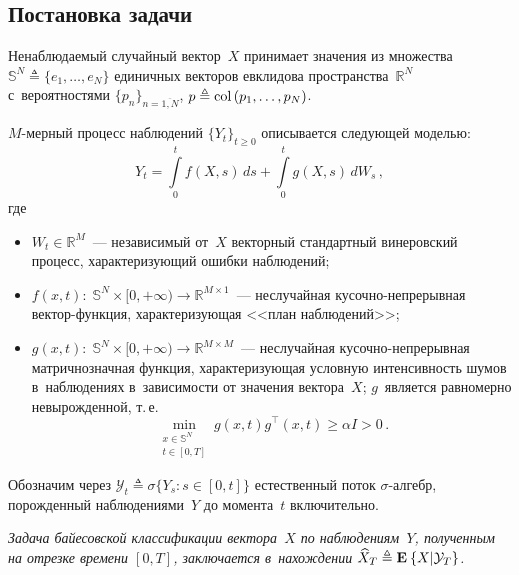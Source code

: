 \begin{multicols}{2}
\vspace*{-9pt}

  \section{Постановка задачи}
  
  \vspace*{-3pt}
  
  Ненаблюдаемый случайный вектор~$X$ принимает значения из множества 
  $\mathbb{S}^N \triangleq \{e_1,\ldots,e_N\}$ единичных векторов евклидова 
  пространства~$\mathbb{R}^N$ с~вероятностями $\{p_n\}_{n=\overline{1,N}}$,
   $p\triangleq \mathop{\mathrm{col}}\,(p_1,\ldots,p_N)$.

  $M$-мерный процесс наблюдений $\{Y_t\}_{t \geqslant 0}$ описывается 
  следующей моделью:
  \begin{equation*}
  Y_t = \int\limits_0^t f(X,s)\,ds + \int\limits_0^t g(X,s)\,dW_s\,,
  \end{equation*}
  где
  \begin{itemize}
  \item
  $W_t \in \mathbb{R}^M$~--- независимый от~$X$ 
  векторный стандартный винеровский процесс, характери\-зу\-ющий ошибки наблюдений;
  \item
  $f(x,t):\;\mathbb{S}^N \times [0,+\infty) \to \mathbb{R}^{M \times 1}$~--- 
  неслучайная ку\-соч\-но-не\-пре\-рыв\-ная век\-тор-функ\-ция, 
  характеризующая <<план наблюдений>>;
  \item
  $g(x,t):\;\mathbb{S}^N \times [0,+\infty) \to \mathbb{R}^{M \times M}$~--- 
  неслучайная ку\-соч\-но-не\-пре\-рыв\-ная матричнозначная функция, характеризующая
условную интенсив\-ность шумов в~наблюдениях в~за\-ви\-си\-мости от значения вектора~$X$; 
$g$~является равномерно невырожденной, т.\,е. 
$$
\min\limits_{\substack{{x \in \mathbb{S}^N}\\ 
{t \in [0,T]}}} g(x,t) g^{\top}(x,t) \geqslant \alpha I > 0\,.
$$
  \end{itemize}

Обозначим через $\mathcal{Y}_t \triangleq \sigma \{Y_s: s \in [0,t] \}$ 
естественный поток $\sigma$-ал\-гебр, порожденный наблюдениями~$Y$ до момента~$t$ 
включительно.

\textit{Задача байесовской классификации вектора~$X$ по наблюдениям~$Y$, 
полученным на отрезке времени $[0,T]$, заключается 
в~нахождении $\widehat{X}_T \triangleq \mathbf{E}_{  }\left\{ \mathop{X|\mathcal{Y}_T} \right\}$.}


\end{multicols}
